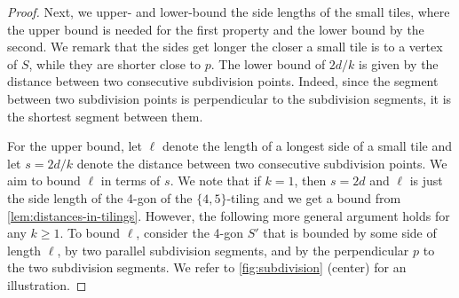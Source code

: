 \documentclass[a4paper,english,cleveref,thm-restate]{lipics-v2021}
\begin{document}
\begin{proof}
    Next, we upper- and lower-bound the side lengths of the small tiles, where the upper bound is needed for the first property and the lower bound by the second.
    We remark that the sides get longer the closer a small tile is to a vertex of $ S $, while they are shorter close to $ p $. 
    The lower bound of $ 2d / k $ is given by the distance between two consecutive subdivision points.
    Indeed, since the segment between two subdivision points is perpendicular to the subdivision segments, it is the shortest segment between them.
    
%     

    For the upper bound, let $ \ell $ denote the length of a longest side of a small tile and let $ s = 2d / k $ denote the distance between two consecutive subdivision points.
    We aim to bound $ \ell $ in terms of $ s $.
    We note that if $k = 1$, then $ s = 2d $ and $ \ell $ is just the side length of the 4-gon of the $\{4, 5\}$-tiling and we get a bound from \cref{lem:distances-in-tilings}.
    However, the following more general argument holds for any $k \ge 1$.
    To bound $\ell$, consider the 4-gon $S'$ that is bounded by some side of length $ \ell $, by two parallel subdivision segments, and by the perpendicular $ p $ to the two subdivision segments.
    We refer to \cref{fig:subdivision} (center) for an illustration.


\end{proof}
\end{document}
